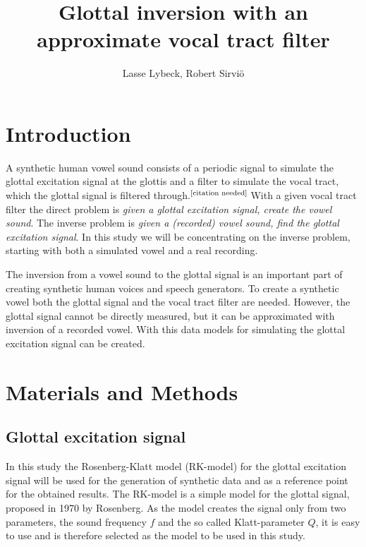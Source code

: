 \documentclass[12pt,a4]{article}
\title{Glottal inversion with an approximate vocal tract filter}
\author{Lasse Lybeck, Robert Sirviö}
\newcommand{\citeneeded}{\ensuremath{\vphantom{1}^{\text{[citation needed]}}\,}}
\begin{document}
\maketitle

\section{Introduction}\label{sec:intro}

A synthetic human vowel sound consists of a periodic signal to simulate the glottal excitation signal at the glottis and a filter to simulate the vocal tract, which the glottal signal is filtered through.\citeneeded With a given vocal tract filter the direct problem is \emph{given a glottal excitation signal, create the vowel sound}. The inverse problem is \emph{given a (recorded) vowel sound, find the glottal excitation signal}. In this study we will be concentrating on the inverse problem, starting with both a simulated vowel and a real recording.

The inversion from a vowel sound to the glottal signal is an important part of creating synthetic human voices and speech generators. To create a synthetic vowel both the glottal signal and the vocal tract filter are needed. However, the glottal signal cannot be directly measured, but it can be approximated with inversion of a recorded vowel. With this data models for simulating the glottal excitation signal can be created.


\section{Materials and Methods}\label{sec:methods}

\subsection{Glottal excitation signal}
\label{sec:rk}

In this study the Rosenberg-Klatt model (RK-model) for the glottal excitation signal will be used for the generation of synthetic data and as a reference point for the obtained results. The RK-model is a simple model for the glottal signal, proposed in 1970 by Rosenberg.\cite{rosenberg} As the model creates the signal only from two parameters, the sound frequency $f$ and the so called Klatt-parameter $Q$, it is easy to use and is therefore selected as the model to be used in this study.
\end{document}
